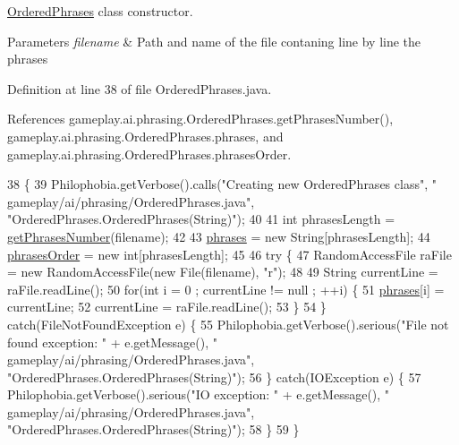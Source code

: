 \hyperlink{a00016}{Ordered\-Phrases} class constructor. 


\begin{DoxyParams}{Parameters}
{\em filename} & Path and name of the file contaning line by line the phrases \\
\hline
\end{DoxyParams}


Definition at line 38 of file Ordered\-Phrases.\-java.



References gameplay.\-ai.\-phrasing.\-Ordered\-Phrases.\-get\-Phrases\-Number(), gameplay.\-ai.\-phrasing.\-Ordered\-Phrases.\-phrases, and gameplay.\-ai.\-phrasing.\-Ordered\-Phrases.\-phrases\-Order.


\begin{DoxyCode}
38                                                  \{
39         Philophobia.getVerbose().calls(\textcolor{stringliteral}{"Creating new OrderedPhrases class"}, \textcolor{stringliteral}{"
      gameplay/ai/phrasing/OrderedPhrases.java"}, \textcolor{stringliteral}{"OrderedPhrases.OrderedPhrases(String)"});
40 
41         \textcolor{keywordtype}{int} phrasesLength = \hyperlink{a00016_a3e549baaecd87057c01a8effafcf0ada}{getPhrasesNumber}(filename);
42 
43         \hyperlink{a00016_ad31c26f17c9c223ae5a4260a77e60729}{phrases} = \textcolor{keyword}{new} String[phrasesLength];
44         \hyperlink{a00016_a8494c96fae41b483dc07c1d513da779e}{phrasesOrder} = \textcolor{keyword}{new} \textcolor{keywordtype}{int}[phrasesLength];
45 
46         \textcolor{keywordflow}{try} \{
47             RandomAccessFile raFile = \textcolor{keyword}{new} RandomAccessFile(\textcolor{keyword}{new} File(filename), \textcolor{stringliteral}{"r"});
48 
49             String currentLine = raFile.readLine();
50             \textcolor{keywordflow}{for}(\textcolor{keywordtype}{int} i = 0 ; currentLine != null ; ++i) \{
51                 \hyperlink{a00016_ad31c26f17c9c223ae5a4260a77e60729}{phrases}[i] = currentLine;
52                 currentLine = raFile.readLine();
53             \}
54         \} \textcolor{keywordflow}{catch}(FileNotFoundException e) \{
55             Philophobia.getVerbose().serious(\textcolor{stringliteral}{"File not found exception: "} + e.getMessage(), \textcolor{stringliteral}{"
      gameplay/ai/phrasing/OrderedPhrases.java"}, \textcolor{stringliteral}{"OrderedPhrases.OrderedPhrases(String)"});
56         \} \textcolor{keywordflow}{catch}(IOException e) \{
57             Philophobia.getVerbose().serious(\textcolor{stringliteral}{"IO exception: "} + e.getMessage(), \textcolor{stringliteral}{"
      gameplay/ai/phrasing/OrderedPhrases.java"}, \textcolor{stringliteral}{"OrderedPhrases.OrderedPhrases(String)"});
58         \}
59     \}
\end{DoxyCode}


